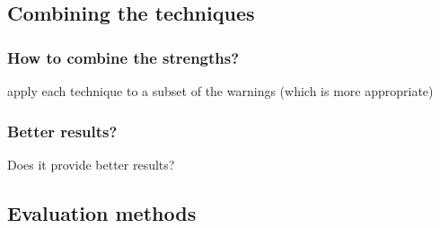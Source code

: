 
\subsection{Combining the techniques}

\subsubsection{How to combine the strengths?}
apply each technique to a subset of the warnings (which is more appropriate)

\subsubsection{Better results?}
Does it provide better results?


\subsection{Evaluation methods}

